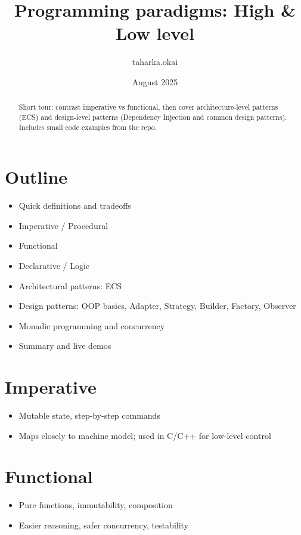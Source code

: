 \documentclass{article}
\title{Programming paradigms: High \& Low level}
\author{taharka.okai}
\date{August 2025}
\begin{document}
\maketitle

\begin{abstract}
Short tour: contrast imperative vs functional, then cover architecture-level patterns (ECS) and design-level patterns (Dependency Injection and common design patterns). Includes small code examples from the repo.
\end{abstract}

\section*{Outline}
\begin{itemize}
  \item Quick definitions and tradeoffs
  \item Imperative / Procedural
  \item Functional
  \item Declarative / Logic
  \item Architectural patterns: ECS
  \item Design patterns: OOP basics, Adapter, Strategy, Builder, Factory, Observer
  \item Monadic programming and concurrency
  \item Summary and live demos
\end{itemize}

\section{Imperative}
\begin{itemize}
  \item Mutable state, step-by-step commands
  \item Maps closely to machine model; used in C/C++ for low-level control
\end{itemize}

\pagebreak

\section{Functional}
\begin{itemize}
  \item Pure functions, immutability, composition
  \item Easier reasoning, safer concurrency, testability
\end{itemize}
\end{document}
